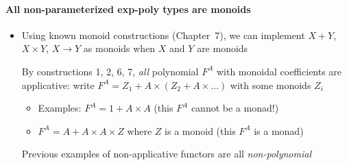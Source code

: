 \paragraph{All non-parameterized exp-poly types are monoids}
\begin{itemize}
\item \vspace{-0.1cm}Using known monoid constructions (Chapter\ 7), we
can implement $X+Y$, $X\times Y$, $X\rightarrow Y$ as monoids when
$X$ and $Y$ are monoids

By constructions 1, 2, 6, 7, \emph{all} polynomial $F^{A}$ with monoidal
coefficients are applicative: write $F^{A}=Z_{1}+A\times\left(Z_{2}+A\times...\right)$
with some monoids $Z_{i}$
\begin{itemize}
\item Examples: $F^{A}=1+A\times A$ (this $F^{A}$ cannot be a monad!)
\item $F^{A}=A+A\times A\times Z$ where $Z$ is a monoid (this $F^{A}$
is a monad)
\end{itemize}
Previous examples of non-applicative functors are all \emph{non-polynomial}
\end{itemize}


